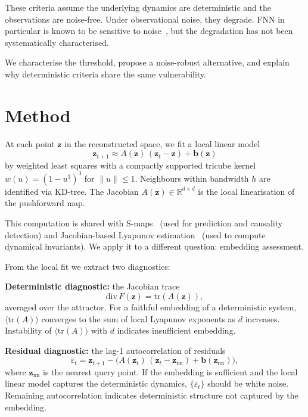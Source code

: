 These criteria assume the underlying dynamics are deterministic
and the observations are noise-free.  Under observational noise,
they degrade.  FNN in particular is known to be sensitive to
noise~\cite{RagwitzKantz2002}, but the degradation has not been
systematically characterised.

We characterise the threshold, propose a noise-robust alternative,
and explain why deterministic criteria share the same vulnerability.

\section{Method}
\label{sec:method}

At each point $\mathbf{z}$ in the reconstructed space, we fit a
local linear model
\begin{equation}\label{eq:local-linear}
  \mathbf{z}_{t+1} \approx A(\mathbf{z})\,
    (\mathbf{z}_t - \mathbf{z}) + \mathbf{b}(\mathbf{z})
\end{equation}
by weighted least squares with a compactly supported tricube
kernel $w(u) = (1 - u^3)^3$ for $\|u\| \leq 1$.  Neighbours
within bandwidth $h$ are identified via KD-tree.  The Jacobian
$A(\mathbf{z}) \in \mathbb{R}^{d \times d}$ is the local
linearisation of the pushforward map.

This computation is shared with S-maps~\cite{Sugihara1994,
DeyleSugihara2011} (used for prediction and causality detection)
and Jacobian-based Lyapunov
estimation~\cite{SanoSawada1985, EckmannKamphorstRuelleEtAl1986}
(used to compute dynamical invariants).  We apply it to a
different question: embedding assessment.

From the local fit we extract two diagnostics:

\medskip
\noindent\textbf{Deterministic diagnostic:} the Jacobian trace
\begin{equation}\label{eq:div}
  \mathrm{div}\, F(\mathbf{z}) = \mathrm{tr}(A(\mathbf{z})),
\end{equation}
averaged over the attractor.  For a faithful embedding of a
deterministic system, $\langle\mathrm{tr}(A)\rangle$ converges
to the sum of local Lyapunov exponents as $d$ increases.
Instability of $\langle\mathrm{tr}(A)\rangle$ with $d$ indicates
insufficient embedding.

\medskip
\noindent\textbf{Residual diagnostic:} the lag-1 autocorrelation
of residuals
\begin{equation}\label{eq:residual}
  \varepsilon_t = \mathbf{z}_{t+1} -
    \bigl(A(\mathbf{z}_t)\,(\mathbf{z}_t - \mathbf{z}_{\mathrm{nn}})
    + \mathbf{b}(\mathbf{z}_{\mathrm{nn}})\bigr),
\end{equation}
where $\mathbf{z}_{\mathrm{nn}}$ is the nearest query point.  If
the embedding is sufficient and the local linear model captures the
deterministic dynamics, $\{\varepsilon_t\}$ should be white noise.
Remaining autocorrelation indicates deterministic structure not
captured by the embedding.

